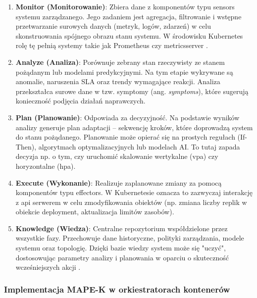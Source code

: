 \begin{enumerate}
    \item \textbf{Monitor (Monitorowanie)}: Zbiera dane z komponentów typu \gls{sensors} systemu zarządzanego. Jego zadaniem jest agregacja, filtrowanie i wstępne przetwarzanie surowych danych (metryk, logów, zdarzeń) w celu skonstruowania spójnego obrazu stanu systemu. W środowisku Kubernetes rolę tę pełnią systemy takie jak Prometheus czy \gls{metricsserver} \cite{weyns2019introduction}.
    
    \item \textbf{Analyze (Analiza)}: Porównuje zebrany stan rzeczywisty ze stanem pożądanym lub modelami predykcyjnymi. Na tym etapie wykrywane są anomalie, naruszenia SLA oraz trendy wymagające reakcji. Analiza przekształca surowe dane w tzw. symptomy (ang. \textit{symptoms}), które sugerują konieczność podjęcia działań naprawczych.
    
    \item \textbf{Plan (Planowanie)}: Odpowiada za decyzyjność. Na podstawie wyników analizy generuje plan adaptacji – sekwencję kroków, które doprowadzą system do stanu pożądanego. Planowanie może opierać się na prostych regułach (If-Then), algorytmach optymalizacyjnych lub modelach AI. To tutaj zapada decyzja np. o tym, czy uruchomić skalowanie wertykalne (\gls{vpa}) czy horyzontalne (\gls{hpa}).
    
    \item \textbf{Execute (Wykonanie)}: Realizuje zaplanowane zmiany za pomocą komponentów typu \gls{effectors}. W Kubernetesie oznacza to zazwyczaj interakcję z \gls{api} serwerem w celu zmodyfikowania obiektów (np. zmiana liczby replik w obiekcie \gls{deployment}, aktualizacja limitów zasobów).
    
    \item \textbf{Knowledge (Wiedza)}: Centralne repozytorium współdzielone przez wszystkie fazy. Przechowuje dane historyczne, polityki zarządzania, modele systemu oraz topologię. Dzięki bazie wiedzy system może się "uczyć", dostosowując parametry analizy i planowania w oparciu o skuteczność wcześniejszych akcji \cite{garlan2004rainbow}.
\end{enumerate}

\subsubsection{Implementacja MAPE-K w orkiestratorach kontenerów}

